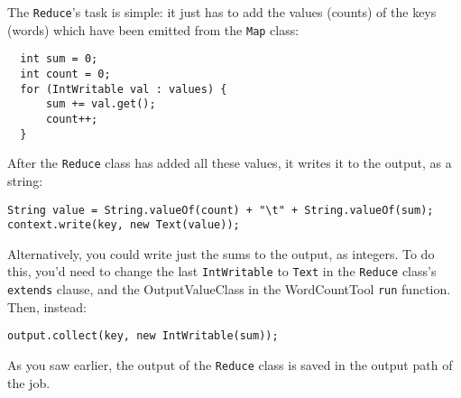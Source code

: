 \documentclass[a4paper,11pt]{article}
\begin{document}
The \texttt{Reduce}'s task is simple: it just has to add the values (counts) of the keys (words) which have been emitted from the \texttt{Map} class: 

\begin{lstlisting}
  int sum = 0;
  int count = 0;
  for (IntWritable val : values) {
	  sum += val.get();
	  count++;
  }
\end{lstlisting}

After the \texttt{Reduce} class has added all these values, it writes it to the output,
as a string: 

\begin{lstlisting}
String value = String.valueOf(count) + "\t" + String.valueOf(sum);
context.write(key, new Text(value));
\end{lstlisting}

Alternatively, you could write just the sums to the output, as integers. To do this, you'd
need to change the last \texttt{IntWritable} to \texttt{Text} in the \texttt{Reduce} class's \texttt{extends} clause, and the OutputValueClass
in the WordCountTool \texttt{run} function. Then, instead:
\begin{lstlisting}
output.collect(key, new IntWritable(sum));
\end{lstlisting}



As you saw earlier, the output of the \texttt{Reduce} class is saved in the output path of the job.




\end{document}
